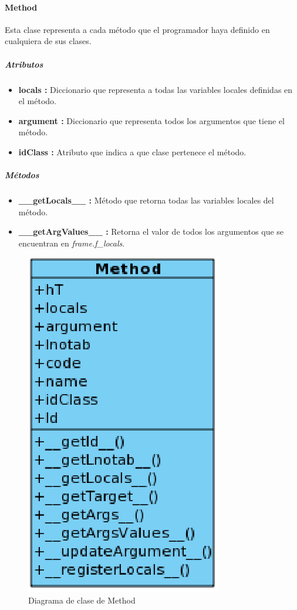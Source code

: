 \documentclass[12pt,legalpaper]{report}
\begin{document}
				\paragraph{Method}
				
Esta clase representa a cada método que el programador haya definido en cualquiera de sus clases.				
				
					\subparagraph{Atributos}
					
\begin{itemize}
	\item \textbf{locals :} Diccionario que representa a todas las variables locales definidas en el método.
	\item \textbf{argument :} Diccionario que representa todos los argumentos que tiene el método.
	\item \textbf{idClass :} Atributo que indica a que clase pertenece el método.
\end{itemize}					
					
					\subparagraph{Métodos}						
					
\begin{itemize}
	\item \textbf{\_\_getLocals\_\_ :} Método que retorna todas las variables locales del método.
	\item \textbf{\_\_getArgValues\_\_ :} Retorna el valor de todos los argumentos que se encuentran en \textit{frame.f\_locals}.
\end{itemize}					
					
				
\begin{figure}[!h]
	\centering
	\includegraphics[scale=0.6]{images/Clases/Method.eps}
	\caption{Diagrama de clase de Method}
\end{figure}
					
\end{document}
